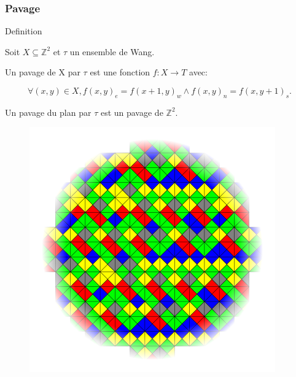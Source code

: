 \documentclass{beamer}
\newcommand{\Z}{\mathbb Z}
\newcommand{\sube}{\subseteq}
\begin{document}
\begin{frame}
\frametitle{Pavage}

\begin{alertblock}{Definition}

    Soit $X \sube \Z^2$ et $\tau$ un ensemble de Wang.

    Un pavage de X par $\tau$ est une fonction $f:X \to T$ avec:
    
    \[\forall (x,y) \in X, {f(x,y)}_e = {f(x+1,y)}_w \land {f(x,y)}_n = {f(x,y+1)}_s.\]
    
    Un pavage du plan par $\tau$ est un pavage de $\Z^2$.
    
\end{alertblock}

\begin{figure}

    \includegraphics[scale = 0.3]{pavage_exemple}
    \centering
    
\end{figure}


\end{frame}
\end{document}
